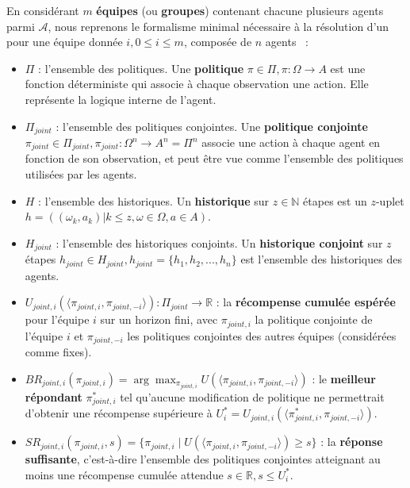 En considérant $m$ \textbf{équipes} (ou \textbf{groupes}) contenant chacune plusieurs agents parmi $\mathcal{A}$, nous reprenons le formalisme minimal nécessaire à la résolution d'un  pour une équipe donnée $i, 0 \leq i \leq m$, composée de $n$ agents~\cite{Beynier2013,Albrecht2024} :

\begin{itemize}
    \item $\Pi$ : l'ensemble des politiques. Une \textbf{politique} $\pi \in \Pi, \pi : \Omega \rightarrow A$ est une fonction déterministe qui associe à chaque observation une action. Elle représente la logique interne de l'agent.
    \item $\Pi_{joint}$ : l'ensemble des politiques conjointes. Une \textbf{politique conjointe} $\pi_{joint} \in \Pi_{joint}, \pi_{joint} : \Omega^n \rightarrow A^n = \Pi^n$ associe une action à chaque agent en fonction de son observation, et peut être vue comme l'ensemble des politiques utilisées par les agents.
    \item $H$ : l'ensemble des historiques. Un \textbf{historique} sur $z \in \mathbb{N}$ étapes est un $z$-uplet $h = ((\omega_k, a_k) | k \leq z, \omega \in \Omega, a \in A)$.
    \item $H_{joint}$ : l'ensemble des historiques conjoints. Un \textbf{historique conjoint} sur $z$ étapes $h_{joint} \in H_{joint}, h_{joint} = \{h_1, h_2, ..., h_n\}$ est l'ensemble des historiques des agents.
    \item $U_{joint,i}(\langle \pi_{joint,i}, \pi_{joint,-i} \rangle): \Pi_{joint} \rightarrow \mathbb{R}$ : la \textbf{récompense cumulée espérée} pour l'équipe $i$ sur un horizon fini, avec $\pi_{joint,i}$ la politique conjointe de l'équipe $i$ et $\pi_{joint,-i}$ les politiques conjointes des autres équipes (considérées comme fixes).
    \item $BR_{joint,i}(\pi_{joint,i}) = \arg\max_{\pi_{joint,i}} U(\langle \pi_{joint,i}, \pi_{joint,-i} \rangle)$ : le \textbf{meilleur répondant} $\pi^*_{joint,i}$ tel qu'aucune modification de politique ne permettrait d'obtenir une récompense supérieure à $U^*_i = U_{joint,i}(\langle \pi^*_{joint,i}, \pi_{joint,-i} \rangle)$.
    \item $SR_{joint,i}(\pi_{joint,i}, s) = \{\pi_{joint,i} \mid U(\langle \pi_{joint,i}, \pi_{joint,-i} \rangle) \geq s\}$ : la \textbf{réponse suffisante}, c'est-à-dire l'ensemble des politiques conjointes atteignant au moins une récompense cumulée attendue $s \in \mathbb{R}, s \leq U^*_i$.
\end{itemize}

